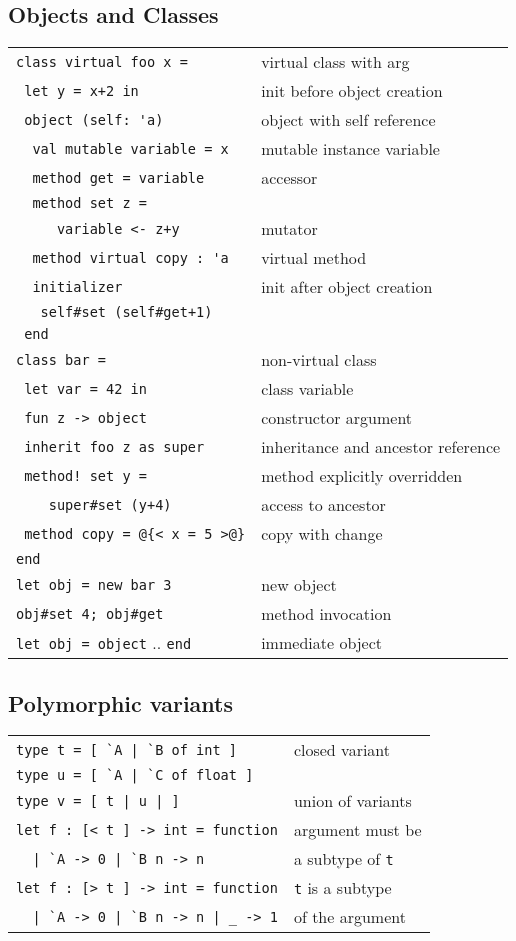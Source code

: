 \documentclass[10pt,landscape]{article}
\begin{document}
\begin{multicols}{3}
\subsection{Objects and Classes}

\begin{tabular}{ll}
\Verb!class virtual foo x = !& virtual class with arg \\
\Verb! let y = x+2 in! & init before object creation\\
\Verb! object (self: 'a)! & object with self reference\\
\Verb!  val mutable variable = x! & mutable instance variable \\
\Verb!  method get = variable! & accessor \\
\Verb!  method set z =!\\
\Verb!     variable <- z+y! & mutator\\
\Verb!  method virtual copy : 'a! & virtual method\\
\Verb!  initializer! & init after object creation\\
\Verb!   self#set (self#get+1)!& \\
\Verb! end! &  \\
\Verb!class bar = !&  non-virtual class\\
\Verb! let var = 42 in! & class variable\\
\Verb! fun z -> object! & constructor argument \\
\verb& inherit foo z as super& & inheritance and ancestor reference\\
\verb& method! set y =& & method explicitly overridden\\
\Verb!    super#set (y+4)! & access to ancestor \\
\Verb! method copy = @{< x = 5 >@}! & copy with change \\
\Verb!end! & \\
\Verb!let obj = new bar 3! & new object \\
\Verb!obj#set 4; obj#get!  & method invocation \\
\Verb!let obj = object! .. \Verb!end! & immediate object \
\end{tabular}

\subsection{Polymorphic variants}


\begin{tabular}{ll}
\Verb!type t = [ `A | `B of int ]! & closed variant \\
\Verb!type u = [ `A | `C of float ]! & \\
\Verb!type v = [ t | u | ]! & union of variants \\
\Verb!let f : [< t ] -> int = function! & argument must be\\
\Verb!  | `A -> 0 | `B n -> n! & \hfill a subtype of \Verb!t!\\
\Verb!let f : [> t ] -> int = function! & \Verb!t! is a subtype \\
\Verb!  | `A -> 0 | `B n -> n | _ -> 1! & \hfill of the argument \\
\end{tabular}

\end{multicols}
\end{document}
